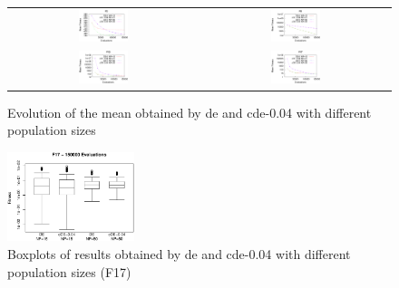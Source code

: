 \documentclass[review,3p]{elsarticle}
\newcommand{\CDE}{c{\sc de}}
\newcommand{\DE}{{\sc de}}
\begin{document}
\begin{figure}[!t]
\centering
\begin{tabular}{cc}
  \includegraphics[width=0.27\textwidth]{images/Pop15_50/F2.eps} & \includegraphics[width=0.27\textwidth]{images/Pop15_50/F8.eps}  \\
  \includegraphics[width=0.27\textwidth]{images/Pop15_50/F13.eps} & \includegraphics[width=0.27\textwidth]{images/Pop15_50/F17.eps}  \\
\end{tabular}
\caption{Evolution of the mean obtained by \DE{} and \CDE{}-0.04 with different population sizes}
\label{fig:pop}
\end{figure}

\begin{figure}[!t]
\centering
\includegraphics[width=0.33\textwidth]{images/Pop15_50/F17_boxplots.eps}
\caption{Boxplots of results obtained by \DE{} and \CDE{}-0.04 with different population sizes (F17)}
\label{fig:pop_f17_boxplots}
\end{figure}
\end{document}
